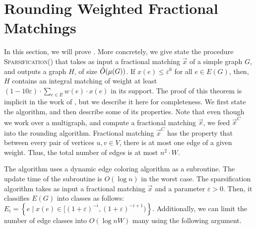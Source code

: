 \documentclass[a4paper,11pt]{article}
\newcommand{\set}[1]{\ensuremath{\left\{ #1 \right\}}}
\newcommand{\eps}{\varepsilon}
\theoremstyle{definition}
\theoremstyle{definition}
\theoremstyle{definition}
\theoremstyle{definition}
\theoremstyle{definition}
\theoremstyle{definition}
\theoremstyle{definition}
\theoremstyle{definition}
\theoremstyle{definition}
\theoremstyle{definition}
\theoremstyle{definition}
\theoremstyle{definition}
\theoremstyle{definition}
\theoremstyle{definition}
\newtheorem{assumption}[definition2]{Assumption}
\theoremstyle{definition}
\begin{document}
\section{Rounding Weighted Fractional Matchings}
\label{sec:rounding}
In this section, we will prove . More concretely, we give state the procedure \textsc{Sparsification}() that takes as input a fractional matching $\vec{x}$ of a simple graph $G$, and outputs a graph $H$, of size $\Tilde{O}(\mu(G))$. If $x(e)\leqslant \eps^6$ for all $e\in E(G)$, then, $H$ contains an integral matching of weight at least $(1-10\eps)\cdot \sum_{e\in E}w(e)\cdot x(e)$ in its support. The proof of this theorem is implicit in the work of \cite{Wajc2020}, but we describe it here for completeness. We first state the algorithm, and then describe some of its properties. Note that even though we work over a multigraph, and compute a fractional matching $\vec{x}$, we feed $\vec{x}^C$ into the rounding algorithm. Fractional matching $\vec{x}^C$ has the property that between every pair of vertices $u,v\in V$, there is at most one edge of a given weight. Thus, the total number of edges is at most $n^2\cdot W$. 


The algorithm uses a dynamic edge coloring algorithm as a subroutine. The update time of the subroutine is $O(\log n)$ in the worst case. The sparsification algorithm takes as input a fractional matching $\vec{x}$ and a parameter $\eps>0$. Then, it classifies $E(G)$ into classes as follows: $E_i=\set{e\mid x(e)\in [(1+\eps)^{-i}, (1+\eps)^{-i+1})}$. Additionally, we can limit the number of edge classes into $O(\log nW)$ many using the following argument.
\end{document}
